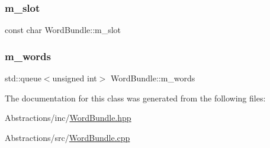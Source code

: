 \subsubsection{\texorpdfstring{m\+\_\+slot}{m\_slot}}
{\footnotesize\ttfamily const char Word\+Bundle\+::m\+\_\+slot\hspace{0.3cm}{\ttfamily [private]}}

\mbox{\label{class_word_bundle_a58233a5455b9a594e3441dd79e3d6a3b}} 
\subsubsection{\texorpdfstring{m\+\_\+words}{m\_words}}
{\footnotesize\ttfamily std\+::queue$<$unsigned int$>$ Word\+Bundle\+::m\+\_\+words\hspace{0.3cm}{\ttfamily [private]}}



The documentation for this class was generated from the following files\+:\begin{DoxyCompactItemize}
\item 
Abstractions/inc/\hyperlink{_word_bundle_8hpp}{Word\+Bundle.\+hpp}\item 
Abstractions/src/\hyperlink{_word_bundle_8cpp}{Word\+Bundle.\+cpp}\end{DoxyCompactItemize}
